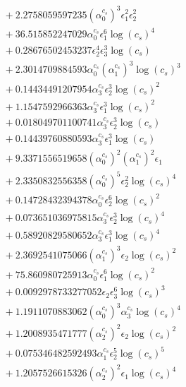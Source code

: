 \documentclass[10pt]{article}
\begin{document}
\begin{align*}
&{}  + 2.2758059597235 \left(\alpha_{0}^{c_s}\right)^{3} \epsilon_{1}^{2} \epsilon_{2}^{2} \\
&{}  + 36.515852247029 \alpha_{0}^{c_s} \epsilon_{1}^{6} \log{\left(c_{s} \right)}^{4} \\
&{}  + 0.28676502453237 \epsilon_{2}^{4} \epsilon_{3}^{3} \log{\left(c_{s} \right)} \\
&{}  + 2.3014709884593 \alpha_{0}^{c_s} \left(\alpha_{1}^{c_s}\right)^{3} \log{\left(c_{s} \right)}^{3} \\
&{}  + 0.14434491207954 \alpha_{3}^{c_s} \epsilon_{2}^{3} \log{\left(c_{s} \right)}^{2} \\
&{}  + 1.1547592966363 \alpha_{3}^{c_s} \epsilon_{1}^{3} \log{\left(c_{s} \right)}^{2} \\
&{}  + 0.018049701100741 \alpha_{3}^{c_s} \epsilon_{2}^{3} \log{\left(c_{s} \right)} \\
&{}  + 0.14439760880593 \alpha_{3}^{c_s} \epsilon_{1}^{3} \log{\left(c_{s} \right)} \\
&{}  + 9.3371556519658 \left(\alpha_{0}^{c_s}\right)^{2} \left(\alpha_{1}^{c_s}\right)^{2} \epsilon_{1} \\
&{}  + 2.3350832556358 \left(\alpha_{0}^{c_s}\right)^{5} \epsilon_{2}^{2} \log{\left(c_{s} \right)}^{4} \\
&{}  + 0.14728432394378 \alpha_{0}^{c_s} \epsilon_{2}^{6} \log{\left(c_{s} \right)}^{2} \\
&{}  + 0.073651036975815 \alpha_{3}^{c_s} \epsilon_{2}^{3} \log{\left(c_{s} \right)}^{4} \\
&{}  + 0.58920829580652 \alpha_{3}^{c_s} \epsilon_{1}^{3} \log{\left(c_{s} \right)}^{4} \\
&{}  + 2.3692541075066 \left(\alpha_{1}^{c_s}\right)^{3} \epsilon_{2} \log{\left(c_{s} \right)}^{2} \\
&{}  + 75.860980725913 \alpha_{0}^{c_s} \epsilon_{1}^{6} \log{\left(c_{s} \right)}^{2} \\
&{}  + 0.0092978733277052 \epsilon_{2} \epsilon_{3}^{6} \log{\left(c_{s} \right)}^{3} \\
&{}  + 1.1911070883062 \left(\alpha_{0}^{c_s}\right)^{3} \alpha_{3}^{c_s} \log{\left(c_{s} \right)}^{4} \\
&{}  + 1.2008935471777 \left(\alpha_{2}^{c_s}\right)^{2} \epsilon_{2} \log{\left(c_{s} \right)}^{2} \\
&{}  + 0.075346482592493 \alpha_{1}^{c_s} \epsilon_{2}^{5} \log{\left(c_{s} \right)}^{5} \\
&{}  + 1.2057526615326 \left(\alpha_{2}^{c_s}\right)^{2} \epsilon_{1} \log{\left(c_{s} \right)}^{4} \\

\end{align*}
\end{document}
